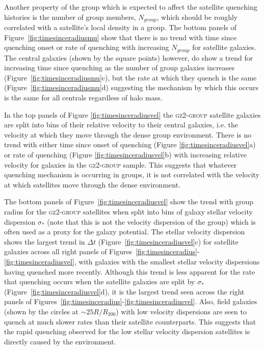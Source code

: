 \documentclass[useAMS,usenatbib]{mn2e}
\begin{document}
Another property of the group which is expected to affect the satellite quenching histories is the number of group members, $N_{group}$, which should be roughly correlated with a satellite's local density in a  group. The bottom panels of Figure~\ref{fig:timesinceradiusmu} show that there is no trend with time since quenching onset or rate of quenching with increasing $N_{group}$ for satellite galaxies. The central galaxies (shown by the square points) however, do show a trend for increasing time since quenching as the number of group galaxies increases (Figure~\ref{fig:timesinceradiusmu}c), but the rate at which they quench is the same (Figure~\ref{fig:timesinceradiusmu}d) suggesting the mechanism by which this occurs is the same for all centrals regardless of halo mass. 

In the top panels of Figure \ref{fig:timesinceradiusvel} the \textsc{gz2-group} satellite galaxies are split into bins of their relative velocity to their central galaxies, i.e. the velocity at which they move through the dense group environment. There is no trend with either time since onset of quenching (Figure \ref{fig:timesinceradiusvel}a) or rate of quenching (Figure \ref{fig:timesinceradiusvel}b) with increasing relative velocity for galaxies in the \textsc{gz2-group} sample. This suggests that whatever quenching mechanism is occurring in groups, it is not correlated with the velocity at which satellites move through the dense environment.

The bottom panels of Figure~\ref{fig:timesinceradiusvel} show the trend with group radius for the \textsc{gz2-group} satellites when split into bins of galaxy stellar velocity dispersion $\sigma_*$ (note that this is not the velocity dispersion of the group) which is often used as a proxy for the galaxy potential. The stellar velocity dispersion shows the largest trend in $\Delta t$ (Figure~\ref{fig:timesinceradiusvel}c) for satellite galaxies across all right panels of Figures~\ref{fig:timesinceradius}-\ref{fig:timesinceradiusvel}, with galaxies with the smallest stellar velocity dispersions having quenched more recently. Although this trend is less apparent for the rate that quenching occurs when the satellite galaxies are split by $\sigma_*$ (Figure~\ref{fig:timesinceradiusvel}d), it is the largest trend seen across the right panels of Figures~\ref{fig:timesinceradius}-\ref{fig:timesinceradiusvel}. Also, field galaxies (shown by the circles at $\sim 25 R/R_{200}$) with low velocity dispersions are seen to quench at much slower rates than their satellite counterparts. This suggests that the rapid quenching observed for the low stellar velocity dispersion satellites is directly caused by the environment. 
\end{document}
